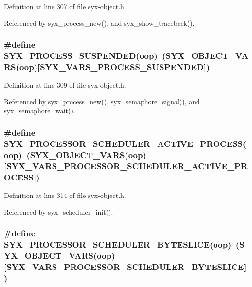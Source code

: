 Definition at line 307 of file syx-object.h.

Referenced by syx\_\-process\_\-new(), and syx\_\-show\_\-traceback().\hypertarget{syx-object_8h_68958798ba77455939de869231f6eee1}{
\subsubsection{\setlength{\rightskip}{0pt plus 5cm}\#define SYX\_\-PROCESS\_\-SUSPENDED(oop)~(SYX\_\-OBJECT\_\-VARS(oop)\mbox{[}SYX\_\-VARS\_\-PROCESS\_\-SUSPENDED\mbox{]})}}
\label{syx-object_8h_68958798ba77455939de869231f6eee1}




Definition at line 309 of file syx-object.h.

Referenced by syx\_\-process\_\-new(), syx\_\-semaphore\_\-signal(), and syx\_\-semaphore\_\-wait().\hypertarget{syx-object_8h_e7a5e7b65675b5e2c49e4ea412119615}{
\subsubsection{\setlength{\rightskip}{0pt plus 5cm}\#define SYX\_\-PROCESSOR\_\-SCHEDULER\_\-ACTIVE\_\-PROCESS(oop)~(SYX\_\-OBJECT\_\-VARS(oop)\mbox{[}SYX\_\-VARS\_\-PROCESSOR\_\-SCHEDULER\_\-ACTIVE\_\-PROCESS\mbox{]})}}
\label{syx-object_8h_e7a5e7b65675b5e2c49e4ea412119615}




Definition at line 314 of file syx-object.h.

Referenced by syx\_\-scheduler\_\-init().\hypertarget{syx-object_8h_f404b8c366724f2aee0d80cc416f4a61}{
\subsubsection{\setlength{\rightskip}{0pt plus 5cm}\#define SYX\_\-PROCESSOR\_\-SCHEDULER\_\-BYTESLICE(oop)~(SYX\_\-OBJECT\_\-VARS(oop)\mbox{[}SYX\_\-VARS\_\-PROCESSOR\_\-SCHEDULER\_\-BYTESLICE\mbox{]})}}
\label{syx-object_8h_f404b8c366724f2aee0d80cc416f4a61}




